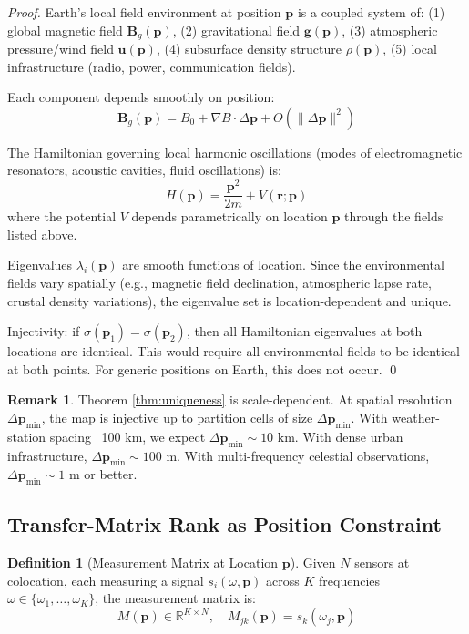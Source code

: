 \documentclass[11pt,twocolumn,a4paper]{article}
\theoremstyle{definition}
\newtheorem{definition}[theorem]{Definition}
\newtheorem{remark}[theorem]{Remark}
\begin{document}
\begin{proof}
Earth's local field environment at position $\mathbf{p}$ is a coupled system of: (1) global magnetic field $\mathbf{B}_g(\mathbf{p})$, (2) gravitational field $\mathbf{g}(\mathbf{p})$, (3) atmospheric pressure/wind field $\mathbf{u}(\mathbf{p})$, (4) subsurface density structure $\rho(\mathbf{p})$, (5) local infrastructure (radio, power, communication fields).

Each component depends smoothly on position:
\[
\mathbf{B}_g(\mathbf{p}) = B_0 + \nabla B \cdot \Delta \mathbf{p} + O(\|\Delta \mathbf{p}\|^2)
\]

The Hamiltonian governing local harmonic oscillations (modes of electromagnetic resonators, acoustic cavities, fluid oscillations) is:
\[
H(\mathbf{p}) = \frac{\mathbf{p}^2}{2m} + V(\mathbf{r}; \mathbf{p})
\]
where the potential $V$ depends parametrically on location $\mathbf{p}$ through the fields listed above.

Eigenvalues $\lambda_i(\mathbf{p})$ are smooth functions of location. Since the environmental fields vary spatially (e.g., magnetic field declination, atmospheric lapse rate, crustal density variations), the eigenvalue set is location-dependent and unique.

Injectivity: if $\sigma(\mathbf{p}_1) = \sigma(\mathbf{p}_2)$, then all Hamiltonian eigenvalues at both locations are identical. This would require all environmental fields to be identical at both points. For generic positions on Earth, this does not occur. \qed
\end{proof}

\begin{remark}
Theorem \ref{thm:uniqueness} is scale-dependent. At spatial resolution $\Delta \mathbf{p}_{\min}$, the map is injective up to partition cells of size $\Delta \mathbf{p}_{\min}$. With weather-station spacing ~100 km, we expect $\Delta \mathbf{p}_{\min} \sim 10$ km. With dense urban infrastructure, $\Delta \mathbf{p}_{\min} \sim 100$ m. With multi-frequency celestial observations, $\Delta \mathbf{p}_{\min} \sim 1$ m or better.
\end{remark}

\subsection{Transfer-Matrix Rank as Position Constraint}

\begin{definition}[Measurement Matrix at Location $\mathbf{p}$]
Given $N$ sensors at colocation, each measuring a signal $s_i(\omega, \mathbf{p})$ across $K$ frequencies $\omega \in \{\omega_1, \ldots, \omega_K\}$, the measurement matrix is:
\[
M(\mathbf{p}) \in \mathbb{R}^{K \times N}, \quad M_{jk}(\mathbf{p}) = s_k(\omega_j, \mathbf{p})
\]
\end{definition}
\end{document}

